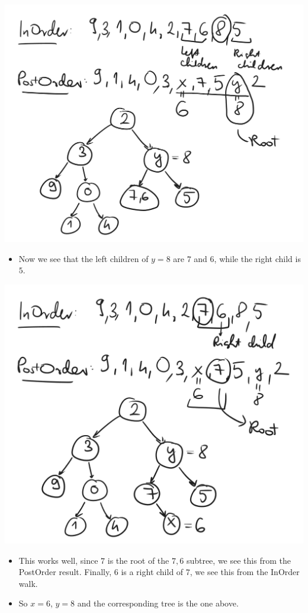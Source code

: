 \begin{center}
    \includegraphics[width=\linewidth]{11/11/reconstruct_08.png}
\end{center}

\begin{itemize}
    \item Now we see that the left children of $y=8$ are $7$ and $6$, while the right child is $5$.
\end{itemize}


\begin{center}
    \includegraphics[width=\linewidth]{11/11/reconstruct_09.png}
\end{center}

\begin{itemize}
    \item This works well, since $7$ is the root of the $7,6$ subtree, we see this from the PostOrder result. Finally, $6$ is a right child of $7$, we see this from the InOrder walk.
    \item So $x=6$, $y=8$ and the corresponding tree is the one above.
\end{itemize}